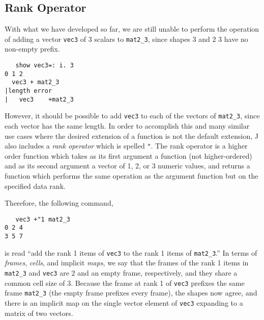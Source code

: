 \subsection{Rank Operator}
With what we have developed so far, we are still unable to perform the operation of 
adding a vector \texttt{vec3} of 3 scalars to \texttt{mat2\_3}, since shapes $3$ and $2$ $3$ have no non-empty prefix.

\begin{singlespacing}
\begin{small}
\begin{verbatim}
   show vec3=: i. 3
0 1 2
  vec3 + mat2_3
|length error
|   vec3    +mat2_3
\end{verbatim}
\end{small}
\end{singlespacing}

However, it should be possible to add \texttt{vec3} to each of the vectors of \texttt{mat2\_3}, since each vector has the same length.
In order to accomplish this and many similar use cases where the desired extension of a function is not the default extension, 
J also includes a \textit{rank operator} which is spelled \texttt{"}.
The rank operator is a higher order function which takes as its first argument a function (not higher-ordered) %
and as its second argument a vector of 1, 2, or 3 numeric values, 
and returns a function which performs the same operation as the argument function but on the specified data rank\cite{rankanduni}.

Therefore, the following command, 

\begin{singlespacing}
\begin{small}
\begin{verbatim}
   vec3 +"1 mat2_3
0 2 4
3 5 7
\end{verbatim}
\end{small}
\end{singlespacing}

is read ``add the rank 1 items of \texttt{vec3} to the rank 1 items of \texttt{mat2\_3}.''
In terms of \textit{frames}, \textit{cells}, and implicit \textit{maps}, we say that
the frames of the rank 1 items in \texttt{mat2\_3} and \texttt{vec3} are $2$ and an empty frame, respectively, and they share a common cell size of $3$.
Because the frame at rank 1 of \texttt{vec3} prefixes the same frame \texttt{mat2\_3} (the empty frame prefixes every frame), 
the shapes now agree, and there is an implicit map on the single vector element of \texttt{vec3} expanding to a matrix of two vectors.

